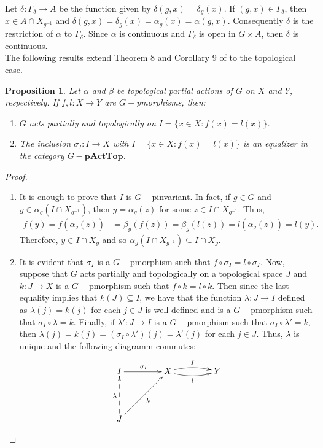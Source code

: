 \documentclass[sn-mathphys-num]{sn-jnl}%
\theoremstyle{thmstyleone}%
\newtheorem{proposition}[theorem]{Proposition}%
\theoremstyle{thmstyletwo}%
\theoremstyle{thmstylethree}%
\begin{document}
Let $ \delta: \Gamma_\delta \to A $ be the function given by $ \delta(g, x) = \delta_g (x) $. If $ (g, x) \in \Gamma_\delta $, then  $ x\in A\cap X_{g^{-1}}$ and $ \delta(g, x) = \delta_g (x)=\alpha_g (x) = \alpha(g, x)$. Consequently $\delta$ is the restriction of $\alpha$ to $\Gamma_\delta$. Since $\alpha$ is continuous and $\Gamma_\delta $ is open in $G\times A$, then  $\delta$ is continuous.\\

The following results extend Theorem 8 and Corollary 9 of \cite{Avila1} to the topological case.\\

\begin{proposition}\label{conjunto I}
Let  $ \alpha $ and $ \beta $ be topological partial actions of $ G $ on $ X $ and $ Y$, respectively. If $ f, l: X \to Y $ are $G-$pmorphisms, then:
\begin{enumerate}
\item $ G $ acts partially and topologically on $ I = \{x \in X: f (x) = l (x) \} $.
\item The inclusion $ \sigma_I: I \to X $ with $ I = \{x \in X: f (x) = l (x) \} $ is an equalizer in the category $G-\mathbf{pActTop}$.
\end{enumerate}
\end{proposition}
\begin{proof}\hspace{0.5cm}
\begin{enumerate}
\item It is enough to prove that $ I $ is $ G-$pinvariant. In fact, if $ g \in G $ and $ y \in \alpha_g (I\cap X_{g^{-1}}) $, then $ y = \alpha_g(z) $ for some $z \in I\cap X_{g^{-1}}$. Thus,
\begin{align*}
f (y) = f (\alpha_g(z)) &= \beta_g(f (z)) = \beta_g(l (z)) = l (\alpha_g(z)) = l (y).
\end{align*}
Therefore, $ y \in I\cap X_{g}$ and so $ \alpha_g (I\cap X_{g^{-1}}) \subseteq I\cap X_{g}$.

\item It is evident that $ \sigma_I $ is a $G-$pmorphism such that $ f \circ \sigma_I = l \circ \sigma_I $. Now, suppose that $ G $ acts partially and topologically on a topological space $ J $ and $ k: J \to X $ is a $ G-$pmorphism such that $ f \circ k = l \circ k $. Then since the last equality implies that $k(J)\subseteq{I}$, we have that the function $ \lambda: J \to I $ defined as $ \lambda (j) = k (j) $ for each $ j \in J $ is well defined and is a $ G-$pmorphism such that $ \sigma_I \circ \lambda = k $. Finally, if $ \lambda ': J \to I $ is a $ G-$pmorphism such that $ \sigma_I \circ \lambda' = k $, then $ \lambda (j) = k (j) = (\sigma_I \circ \lambda ') (j) = \lambda' (j) $ for each  $ j \in J $. Thus, $ \lambda $ is unique and the following diagramm commutes:
$$
\xymatrix@=1.5cm{
I \ar[r]^{\sigma_I}  & X \ar@/_0.4pc/[r]_{l} \ar@/_{-0.4pc}/[r]^{f}&  Y\\
J  \ar@{-->}[u]^{\lambda} \ar[ur]_{k}& &
}
$$
\end{enumerate}
\end{proof}
\end{document}
